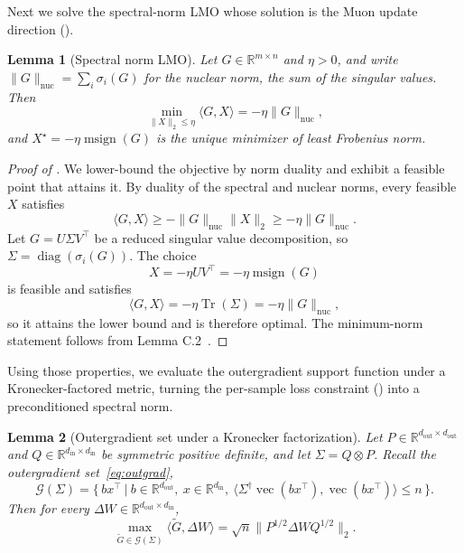 \documentclass[11pt]{article}
\renewcommand{\vec}{\operatorname{vec}}
\newcommand{\R}{\mathbb{R}}
\DeclareMathOperator{\diag}{diag}
\DeclareMathOperator{\Tr}{Tr}
\newcommand{\ip}[1]{\langle #1 \rangle}
\DeclareMathOperator{\msign}{msign}          %
\newcommand{\norm}[1]{\| #1\|}
\theoremstyle{plain}
\newtheorem{lemma}{Lemma}
\theoremstyle{definition}
\theoremstyle{remark}
\theoremstyle{definition}
\begin{document}
Next we solve the spectral-norm LMO whose solution is the Muon update direction ().
\begin{lemma}[Spectral norm LMO]\label{lem:muon-lmo}
Let $G\in\mathbb{R}^{m\times n}$ and $\eta>0$, and write
$\norm{G}_{\mathrm{nuc}}=\sum_i\sigma_i(G)$ for the nuclear norm, the sum of the
singular values. Then
\[
    \min_{\norm{X}_2\leq \eta}\ip{G,X}
    =
    -\eta\norm{G}_{\mathrm{nuc}},
\]
and $X^\star = -\eta\msign(G)$ is the unique minimizer of least Frobenius norm.
\end{lemma}

\begin{proof}[Proof of ]
We lower-bound the objective by norm duality and exhibit a feasible point that
attains it. By duality of the spectral and nuclear norms, every feasible $X$
satisfies
\[
    \ip{G,X}
    \geq
    -\norm{G}_{\mathrm{nuc}}\norm{X}_2
    \geq
    -\eta\norm{G}_{\mathrm{nuc}}.
\]
Let $G=U\Sigma V^\top$ be a reduced singular value decomposition, so
$\Sigma=\diag(\sigma_i(G))$. The choice
\[
    X=-\eta UV^\top=-\eta\msign(G)
\]
is feasible and satisfies
\[
    \ip{G,X}
    =
    -\eta\Tr(\Sigma)
    =
    -\eta\norm{G}_{\mathrm{nuc}},
\]
so it attains the lower bound and is therefore optimal. The minimum-norm
statement follows from Lemma C.2~\cite{parshakova2026muon}.
\end{proof}

Using those properties, we evaluate the outergradient support function under a Kronecker-factored metric, turning the per-sample loss constraint () into a preconditioned spectral norm.
\begin{lemma}[Outergradient set under a Kronecker factorization]
\label{lem:pseudogradient-spectral}
Let
$P\in\R^{d_{\mathrm{out}}\times d_{\mathrm{out}}}$ and
$Q\in\R^{d_{\mathrm{in}}\times d_{\mathrm{in}}}$ be symmetric positive definite,
and let $\Sigma=Q\otimes P$. Recall the outergradient set~\eqref{eq:outgrad},
\[
\mathcal{G}(\Sigma)=\bigl\{\, bx^\top ~\big|~ b\in\R^{d_{\mathrm{out}}},\ x\in\R^{d_{\mathrm{in}}},\ \ip{\Sigma^\dagger\vec(bx^\top),\vec(bx^\top)}\leq n \,\bigr\}.
\]
Then for every $\Delta W\in\R^{d_{\mathrm{out}}\times d_{\mathrm{in}}}$,
\[
  \max_{\widetilde{G} \in \mathcal{G}(\Sigma)} \ip{ \widetilde{G} , \Delta W}
  =\sqrt{n}\norm{P^{1/2}\Delta W Q^{1/2}}_2 .
\]
\end{lemma}
\end{document}
